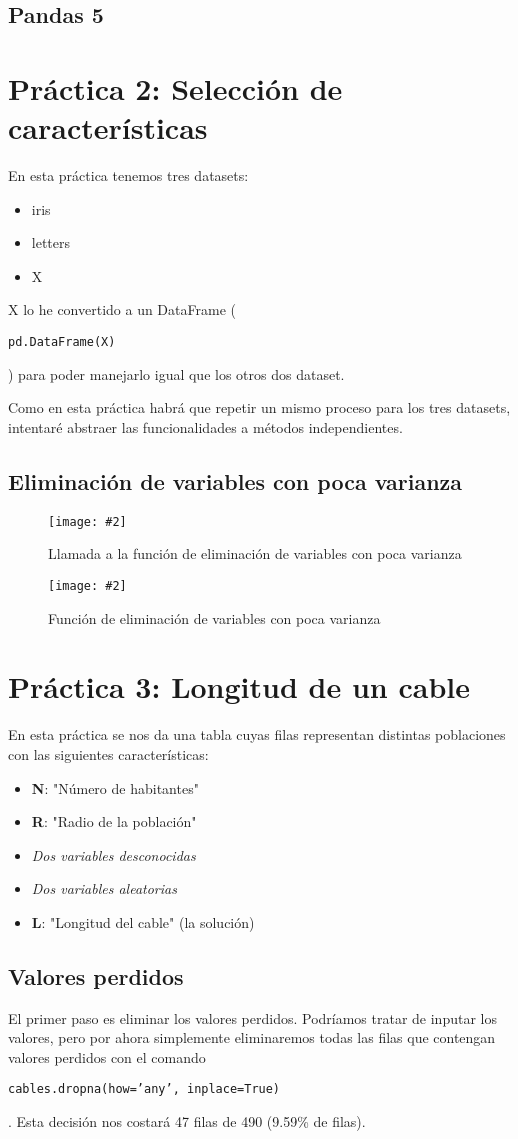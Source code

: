 \documentclass[
12pt, 
spanish, 
singlespacing,
headsepline
]{article}
\newcommand{\image}[2]{
\begin{figure}[H]
	\caption{#1}
	\centering
	\texttt{[image: \#2]}
\end{figure}
}
\newcommand{\code}[1]{\colorbox{light-gray}{\parbox{\dimexpr\linewidth-2\fboxsep}{\strut  \texttt{#1}\strut}}}
\begin{document}
\subsection{Pandas 5}

\section{Práctica 2: Selección de características}
En esta práctica tenemos tres datasets:
\begin{itemize}
\item iris
\item letters
\item X
\end{itemize}

X lo he convertido a un DataFrame (\code{pd.DataFrame(X)}) para poder manejarlo igual que los otros dos dataset.

Como en esta práctica habrá que repetir un mismo proceso para los tres datasets, intentaré abstraer las funcionalidades a métodos independientes.

\subsection{Eliminación de variables con poca varianza}
\image{Llamada a la función de eliminación de variables con poca varianza}{pl2/Figure_7.png}
\image{Función de eliminación de variables con poca varianza}{pl2/Figure_7.1.png}

\section{Práctica 3: Longitud de un cable}
En esta práctica se nos da una tabla cuyas filas representan distintas poblaciones con las siguientes características:
\begin{itemize}
\item \textbf{N}: "Número de habitantes"
\item \textbf{R}: "Radio de la población"
\item \textit{Dos variables desconocidas}
\item \textit{Dos variables aleatorias}
\item \textbf{L}: "Longitud del cable" (la solución)
\end{itemize}

\subsection{Valores perdidos}
El primer paso es eliminar los valores perdidos. Podríamos tratar de inputar los valores, pero por ahora simplemente eliminaremos todas las filas que contengan valores perdidos con el comando \code{cables.dropna(how='any', inplace=True)}. Esta decisión nos costará 47 filas de 490 (9.59\% de filas).
\end{document}
